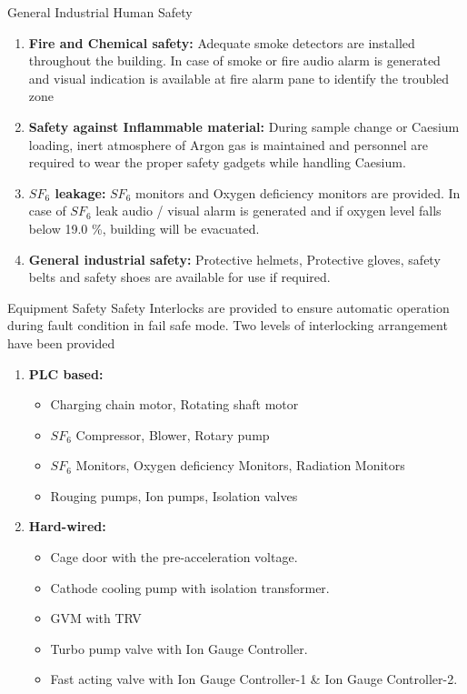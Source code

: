 \documentclass[11pt]{beamer}
\begin{document}
\begin{frame}{General Industrial Human Safety}

\begin{enumerate} 
 \item \textbf{Fire and Chemical safety:}
  Adequate  smoke detectors are installed  throughout the building. In case of smoke or fire audio alarm is generated and visual indication is available at fire alarm pane to identify the troubled zone
 \item \textbf{Safety against Inflammable material:}
 During sample change or Caesium loading, inert atmosphere of Argon gas is maintained and personnel are required to wear the proper safety gadgets while handling Caesium.
 \item \textbf{$SF_6$ leakage:}
 $SF_6$ monitors and Oxygen deficiency monitors are provided. In case of $SF_6$  leak audio / visual alarm is generated and if oxygen level falls below 19.0 \%,  building  will be evacuated.
\item \textbf{General industrial safety:}
Protective helmets, Protective gloves, safety belts and safety shoes are available for use if required.
\end{enumerate}		
	 
 
\end{frame}


\begin{frame}{Equipment Safety}
Safety Interlocks are provided to ensure automatic operation during fault condition in fail safe mode. Two levels of interlocking arrangement have been provided 
\begin{enumerate} 
 \item \textbf{PLC based:}
  \begin{itemize}
  \item  Charging chain  motor, Rotating shaft motor
  \item  $SF_6$  Compressor, Blower, Rotary pump
  \item  $SF_6$  Monitors, Oxygen deficiency Monitors, Radiation Monitors
  \item  Rouging pumps, Ion pumps, Isolation valves 
  \end{itemize} 
 \item \textbf{Hard-wired:}
\begin{itemize}
\item  Cage door with the pre-acceleration voltage.
\item  Cathode cooling pump with isolation transformer.
\item  GVM with TRV
\item  Turbo pump valve with Ion Gauge Controller.
\item  Fast acting valve with Ion Gauge Controller-1 \& Ion Gauge Controller-2.
\end{itemize} 
\end{enumerate}		
	 
 
\end{frame}
\end{document}
